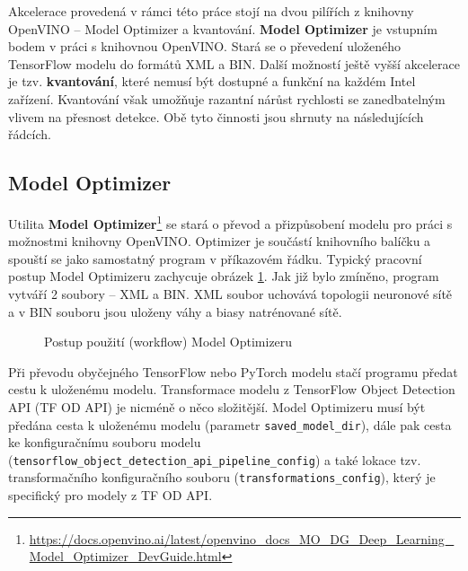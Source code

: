 Akcelerace provedená v rámci této práce stojí na dvou pilířích z knihovny OpenVINO -- Model Optimizer a kvantování. \textbf{Model Optimizer} je vstupním bodem v práci s knihovnou OpenVINO. Stará se o převedení uloženého TensorFlow modelu do formátů XML a BIN. Další možností ještě vyšší akcelerace je tzv. \textbf{kvantování}, které nemusí být dostupné a funkční na každém Intel zařízení. Kvantování však umožňuje razantní nárůst rychlosti se zanedbatelným vlivem na přesnost detekce. Obě tyto činnosti jsou shrnuty na následujících řádcích.

\subsection*{Model Optimizer}
Utilita \textbf{Model Optimizer}\footnote{\url{https://docs.openvino.ai/latest/openvino_docs_MO_DG_Deep_Learning_Model_Optimizer_DevGuide.html}} se stará o převod a přizpůsobení modelu pro práci s možnostmi knihovny OpenVINO. Optimizer je součástí knihovního balíčku a spouští se jako samostatný program v příkazovém řádku. Typický pracovní postup Model Optimizeru zachycuje obrázek \ref{obrazek:moworkflow}. Jak již bylo zmíněno, program vytváří 2 soubory -- XML a BIN. XML soubor uchovává topologii neuronové sítě a v BIN souboru jsou uloženy váhy a biasy natrénované sítě.

\begin{figure}[H]
  \begin{center}
  \label{obrazek:moworkflow}
  \caption{Postup použití (workflow) Model Optimizeru}
  \end{center}
\end{figure}

Při převodu obyčejného TensorFlow nebo PyTorch modelu stačí programu předat cestu k uloženému modelu. Transformace modelu z TensorFlow Object Detection API (TF OD API) je nicméně o něco složitější. Model Optimizeru musí být předána cesta k uloženému modelu (parametr \texttt{saved\_model\_dir}), dále pak cesta ke konfiguračnímu souboru modelu (\texttt{tensorflow\_object\_detection\_api\_pipeline\_config}) a také lokace tzv. transformačního konfiguračního souboru (\texttt{transformations\_config}), který je specifický pro modely z TF OD API.

